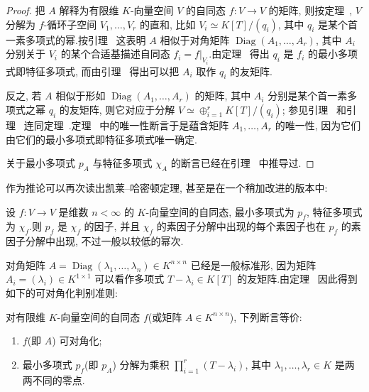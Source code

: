 \begin{proof}
把 $A$ 解释为有限维 $K$-向量空间 $V$ 的自同态 $f \colon V \longrightarrow V$ 的矩阵, 则按定理~, $V$ 分解为 $f$-循环子空间 $V_1, \ldots, V_r$ 的直和, 比如 $V_i \simeq K[T]/(q_i)$, 其中 $q_i$ 是某个首一素多项式的幂.按引理~ 这表明 $A$ 相似于对角矩阵 $\operatorname{Diag}(A_1, \ldots, A_r)$, 其中 $A_i$ 分别关于 $V_i$ 的某个合适基描述自同态 $f_i = f|_{V_i}$.由定理~ 得出 $q_i$ 是 $f_i$ 的最小多项式即特征多项式, 而由引理~ 得出可以把 $A_i$ 取作 $q_i$ 的友矩阵.

反之, 若 $A$ 相似于形如 $\operatorname{Diag}(A_1, \ldots, A_r)$ 的矩阵, 其中 $A_i$ 分别是某个首一素多项式之幂 $q_i$ 的友矩阵, 则它对应于分解 $V \simeq \oplus_{i = 1}^{r} K[T]/(q_i)$; 参见引理~ 和引理~ 连同定理~.定理~ 中的唯一性断言于是蕴含矩阵 $A_1, \ldots, A_r$ 的唯一性, 因为它们由它们的最小多项式即特征多项式唯一确定.

关于最小多项式 $p_A$ 与特征多项式 $\chi_A$ 的断言已经在引理~ 中推导过.
\end{proof}

作为推论可以再次读出凯莱--哈密顿定理, 甚至是在一个稍加改进的版本中:

\begin{corollary}[凯莱--哈密顿]\label{cor:6.5.12}
设 $f \colon V \longrightarrow V$ 是维数 $n < \infty$ 的 $K$-向量空间的自同态, 最小多项式为 $p_f$, 特征多项式为 $\chi_f$.则 $p_f$ 是 $\chi_f$ 的因子, 并且 $\chi_f$ 的素因子分解中出现的每个素因子也在 $p_f$ 的素因子分解中出现, 不过一般以较低的幂次.
\end{corollary}

对角矩阵 $A = \operatorname{Diag}(\lambda_1, \ldots, \lambda_n) \in K^{n \times n}$ 已经是一般标准形, 因为矩阵 $A_i = (\lambda_i) \in K^{1 \times 1}$ 可以看作多项式 $T - \lambda_i \in K[T]$ 的友矩阵.由定理~ 因此得到如下的可对角化判别准则:

\begin{corollary}\label{cor:6.5.13}
对有限维 $K$-向量空间的自同态 $f$(或矩阵 $A \in K^{n \times n}$), 下列断言等价:
\begin{enumerate}
\item[(i)] $f$(即 $A$) 可对角化;
\item[(ii)] 最小多项式 $p_f$(即 $p_A$) 分解为乘积 $\prod_{i = 1}^{r}(T - \lambda_i)$, 其中 $\lambda_1, \ldots, \lambda_r \in K$ 是两两不同的零点.
\end{enumerate}
\end{corollary}


